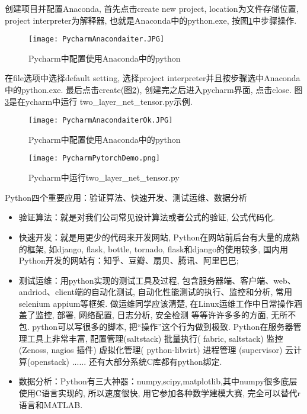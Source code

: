 创建项目并配置Anaconda, 首先点击create new project, location为文件存储位置, project interpreter为解释器, 也就是Anaconda中的python.exe, 按图\ref{PycharmAnacondaiter1218001}中步骤操作.
\begin{figure}[htbp]
\centering
\texttt{[image: PycharmAnacondaiter.JPG]}
\caption{Pycharm中配置使用Anaconda中的python}
\label{PycharmAnacondaiter1218001}
\end{figure}
在file选项中选择default setting, 选择project interpreter并且按步骤选中Anaconda中的python.exe.
最后点击create(图\ref{PycharmAnacondaiter1218002}), 创建完之后进入pycharm界面, 点击close.
图\ref{PycharmPytorchDemo}是在ycharm中运行 two\_layer\_net\_tensor.py示例.
\begin{figure}[H]
\centering
\texttt{[image: PycharmAnacondaiterOk.JPG]}
\caption{Pycharm中配置使用Anaconda中的python}
\label{PycharmAnacondaiter1218002}
\end{figure}
\begin{figure}[htbp]
\centering
\texttt{[image: PycharmPytorchDemo.png]}
\caption{Pycharm中运行two\_layer\_net\_tensor.py}
\label{PycharmPytorchDemo}
\end{figure}

Python四个重要应用：验证算法、快速开发、测试运维、数据分析
\begin{itemize}
\item 验证算法：就是对我们公司常见设计算法或者公式的验证, 公式代码化.
\item 快速开发：就是用更少的代码来开发网站, Python在网站前后台有大量的成熟的框架, 如django, flask, bottle, tornado, flask和django的使用较多, 国内用Python开发的网站有：知乎、豆瓣、扇贝、腾讯、阿里巴巴;
\item 测试运维：用python实现的测试工具及过程, 包含服务器端、客户端、web、andriod、client端的自动化测试, 自动化性能测试的执行、监控和分析, 常用selenium appium等框架.
做运维同学应该清楚, 在Linux运维工作中日常操作涵盖了监控, 部署, 网络配置, 日志分析, 安全检测 等等许许多多的方面, 无所不包. python可以写很多的脚本, 把“操作”这个行为做到极致.
Python在服务器管理工具上非常丰富, 配置管理(saltstack) 批量执行( fabric, saltstack) 监控(Zenoss, nagios 插件) 虚拟化管理( python-libvirt) 进程管理 (supervisor) 云计算(openstack) ...... 还有大部分系统C库都有python绑定.
\item 数据分析：Python有三大神器：numpy,scipy,matplotlib,其中numpy很多底层使用C语言实现的, 所以速度很快, 用它参加各种数学建模大赛, 完全可以替代r语言和MATLAB.
\end{itemize}


